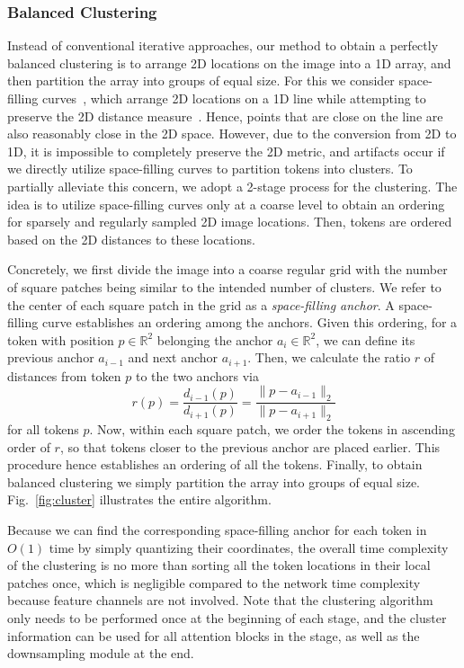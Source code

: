 \documentclass[10pt,twocolumn,letterpaper]{article}
\begin{document}
\subsubsection{Balanced Clustering}
Instead of conventional iterative approaches, our method to obtain a perfectly balanced clustering is to arrange 2D locations on the image 
into a 1D array, and then partition the array into groups of equal size. For this we consider space-filling curves~\cite{peano}, which arrange 2D locations on a 1D line while attempting to preserve the 2D distance measure~\cite{moon2001analysis}. Hence, points that are close on the line are also reasonably close in the 2D space. However, due to the conversion from 2D to 1D, it is impossible to completely preserve the 2D metric, and artifacts occur if we directly utilize space-filling curves to partition tokens into clusters. To partially alleviate this concern, we adopt a 2-stage process for the clustering. The idea is to utilize space-filling curves only at a coarse level to obtain an ordering for sparsely and regularly sampled 2D image locations. Then, tokens are ordered based on the 2D distances to these locations.


Concretely, we first divide the image into a coarse regular grid with the number of square patches being similar to the intended number of clusters. We refer to the center of each square patch in the grid  as a \textit{space-filling anchor}. A space-filling curve establishes an ordering among the anchors. Given this ordering, for a token with position $p\in \mathbb{R}^2$ belonging the anchor $a_i\in \mathbb{R}^2$, we can define its previous anchor $a_{i-1}$ and next anchor $a_{i+1}$. 
Then, we calculate the ratio $r$ of distances from token $p$ to the two anchors via
\begin{equation}
    r(p) = \dfrac{d_{i-1}(p)}{d_{i+1}(p)} = \dfrac{\|p-a_{i-1}\|_2}{\|p-a_{i+1}\|_2}
\end{equation}
for all tokens $p$.
Now, within each square patch, we order the tokens in ascending order of $r$, so that  tokens closer to the previous anchor are placed earlier. This procedure hence establishes an ordering of all the tokens. 
Finally, to obtain balanced clustering we simply partition the array into groups of equal size. Fig.~\ref{fig:cluster} illustrates the entire algorithm.


Because we can find the corresponding space-filling anchor for each token in $O(1)$ time by simply quantizing their coordinates, the overall time complexity of the clustering is no more than sorting all the token locations in their local patches once, which is negligible compared to the network time complexity because feature channels are not involved. Note that the clustering algorithm only needs to be performed once at the beginning of each stage, and the cluster information can be used for all attention blocks in the stage, as well as the downsampling module at the end.
\end{document}
